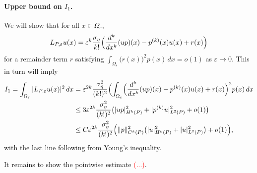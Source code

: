\documentclass{article}
\newcommand{\1}{\mathbf{1}}
\newcommand{\Leb}{L}
\theoremstyle{definition}
\theoremstyle{remark}
\begin{document}
\paragraph{Upper bound on $I_1$.}
We will show that for all $x \in \Omega_{\varepsilon}$,
\begin{equation*}
L_{P,\varepsilon}u(x) = \varepsilon^{k} \frac{\sigma_\eta}{k!}\Bigl( \frac{d^k}{dx^k}(up)(x) - p^{(k)}(x)u(x) + r(x)\Bigr)
\end{equation*}
for a remainder term $r$ satisfying $\int_{\Omega_{\varepsilon}} \bigl(r(x)\bigr)^2 p(x) \,dx  = o(1)$ as $\varepsilon \to 0$. This in turn will imply
\begin{align*}
I_1 = \int_{\Omega_{\varepsilon}} |L_{P,\varepsilon}u(x)|^2 \,dx & = \varepsilon^{2k} \frac{\sigma_\eta^2}{(k!)^2}\Bigl(\int_{\Omega_{\varepsilon}} \Bigl( \frac{d^k}{dx^k}(up)(x) - p^{(k)}(x)u(x) + r(x)\Bigr)^2  p(x) \,dx \\
& \leq 3 \varepsilon^{2k} \frac{\sigma_\eta^2}{(k!)^2} \bigl( |up|_{H^k(P)}^2 + |p^{(k)}u|_{\Leb^2(P)}^2 + o(1)\bigr) \\
& \leq C \varepsilon^{2k} \frac{\sigma_\eta^2}{(k!)^2} \Bigl( \|p\|_{C^k(P)}^2\bigl(|u|_{H^k(P)}^2 + |u|_{\Leb^2(P)}^2\bigr) + o(1) \Bigr),
\end{align*}
with the last line following from Young's inequality.

It remains to show the pointwise estimate \textcolor{red}{(...)}.
\end{document}
